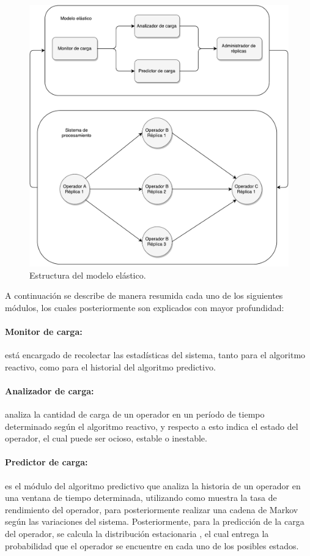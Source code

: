 \begin{figure}[ht!]
  \centering
    \includegraphics[scale=0.5]{images/Diagrama.pdf}
  \caption{Estructura del modelo elástico.}
  \label{fig:componentesSistemas}
\end{figure}

A continuación se describe de manera resumida cada uno de los siguientes módulos, los cuales posteriormente son explicados con mayor profundidad:

\paragraph{Monitor de carga:} está encargado de recolectar las estadísticas del sistema, tanto para el algoritmo reactivo, como para el historial del algoritmo predictivo.

\paragraph{Analizador de carga:} analiza la cantidad de carga de un operador en un período de tiempo determinado según el algoritmo reactivo, y respecto a esto indica el estado del operador,  el cual puede ser ocioso, estable o inestable.

\paragraph{Predictor de carga:} es el módulo del algoritmo predictivo que analiza la historia de un operador en una ventana de tiempo determinada, utilizando como muestra la tasa de rendimiento del operador, para posteriormente realizar una cadena de Markov según las variaciones del sistema. Posteriormente, para la predicción de la carga del operador, se calcula la distribución estacionaria \citep{Papoulis1984}, el cual entrega la probabilidad que el operador se encuentre en cada uno de los posibles estados.

